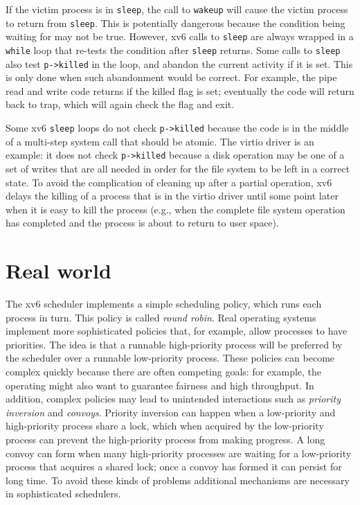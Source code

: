 If the victim process is in
\lstinline{sleep},
the call to
\lstinline{wakeup}
will cause the victim process to return from
\lstinline{sleep}.
This is potentially dangerous because 
the condition being waiting for may not be true.
However, xv6 calls to
\lstinline{sleep}
are always wrapped in a
\lstinline{while}
loop that re-tests the condition after
\lstinline{sleep}
returns.
Some calls to
\lstinline{sleep}
also test
\lstinline{p->killed}
in the loop, and abandon the current activity if it is set.
This is only done when such abandonment would be correct.
For example, the pipe read and write code
returns if the killed flag is set; eventually the
code will return back to trap, which will again
check the flag and exit.

Some xv6 
\lstinline{sleep}
loops do not check
\lstinline{p->killed} 
because the code is in the middle of a multi-step
system call that should be atomic.
The virtio driver
is an example: it does not check
\lstinline{p->killed}
because a disk operation may be one of a set of
writes that are all needed in order for the file system to
be left in a correct state.
To avoid the complication of cleaning up after a partial operation, xv6 delays
the killing of a process that is in the virtio driver until some point later when
it is easy to kill the process (e.g., when the complete file system operation
has completed and the process is about to return to user space).
\section{Real world}

The xv6 scheduler implements a simple scheduling policy, which runs each process
in turn.  This policy is called
\textit{round robin}.
Real operating systems implement more sophisticated policies that, for example,
allow processes to have priorities.  The idea is that a runnable high-priority process
will be preferred by the scheduler over a runnable low-priority process.   These
policies can become complex quickly because there are often competing goals: for
example, the operating might also want to guarantee fairness and
high throughput.  In addition, complex policies may lead to unintended
interactions such as
\textit{priority inversion}
and 
\textit{convoys}.
Priority inversion can happen when a low-priority and high-priority process
share a lock, which when acquired by the low-priority process can prevent the
high-priority process from making progress.  A long convoy can form when many
high-priority processes are waiting for a low-priority process that acquires a
shared lock; once a convoy has formed it can persist for long time.
To avoid these kinds of problems additional mechanisms are necessary in
sophisticated schedulers.

